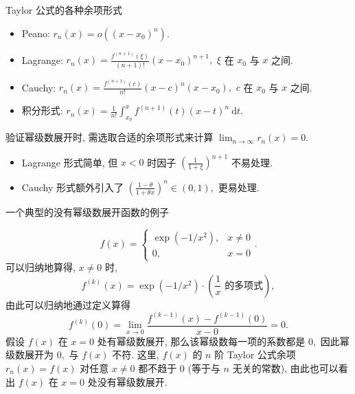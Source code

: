 \begin{frame}{Taylor 公式的各种余项形式}

\begin{recall}[余项公式总结]
\begin{itemize}
\item Peano: $r_n(x) = o((x-x_0)^n).$
\pause
\item Lagrange: $r_n(x) = \frac{f^{(n+1)}(\xi)}{(n+1)!} (x-x_0)^{n+1},$ $\xi$ 在 $x_0$ 与 $x$ 之间.
\pause
\item Cauchy: $r_n(x) = \frac{f^{(n+1)}(c)}{n!} (x-c)^n (x-x_0),$ $c$ 在 $x_0$ 与 $x$ 之间.
\pause
\item {\color{red}积分形式}: $r_n(x) = \frac{1}{n!} \int_{x_0}^x f^{(n+1)}(t) (x-t)^n ~ \mathrm{d}t.$
\end{itemize}
\end{recall}

\pause

验证幂级数展开时, 需选取合适的余项形式来计算 $\lim_{n\to\infty} r_n(x) = 0.$
\begin{itemize}[<+->]
\item Lagrange 形式简单, 但 $x < 0$ 时因子 $(\frac{1}{1+\xi})^{n+1}$ 不易处理.
\item Cauchy 形式额外引入了 $(\frac{1-\theta}{1+\theta x})^n \in (0, 1),$ 更易处理.
\end{itemize}

\end{frame}


\begin{frame}{一个典型的没有幂级数展开函数的例子}

\[f(x) = \begin{cases} \exp(-1/x^2), & x \neq 0 \\ 0, & x = 0 \end{cases}.\]
\pause
可以归纳地算得, $x \neq 0$ 时,
\[f^{(k)}(x) = \exp(-1/x^2) \cdot \left( \text{$\dfrac{1}{x}$ 的多项式} \right),\]
由此可以归纳地通过定义算得
\[f^{(k)}(0) = \lim\limits_{x\to 0} \dfrac{f^{(k-1)}(x) - f^{(k-1)}(0)}{x-0} = 0.\]
\pause
假设 $f(x)$ 在 $x = 0$ 处有幂级数展开, 那么该幂级数每一项的系数都是 $0,$ 因此幂级数展开为 $0,$ 与 $f(x)$ 不符.
\pause
这里, $f(x)$ 的 $n$ 阶 Taylor 公式余项 $r_n(x) = f(x)$ 对任意 $x \neq 0$ 都不趋于 $0$ (等于与 $n$ 无关的常数), 由此也可以看出 $f(x)$ 在 $x = 0$ 处没有幂级数展开.

\end{frame}


